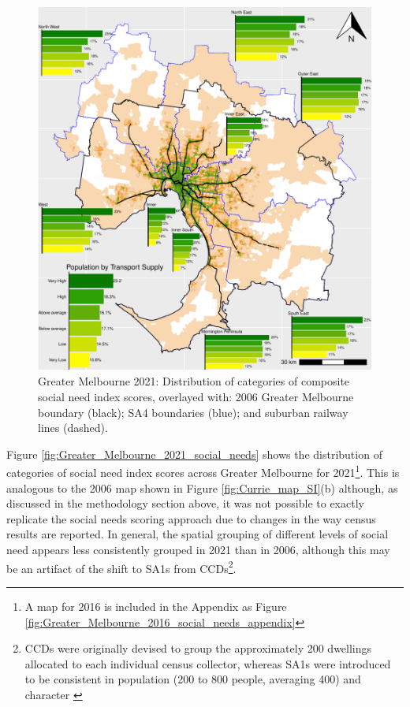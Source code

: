 \documentclass[preprint, 3p,
authoryear]{elsarticle} %
\begin{document}
\begin{figure}
\centering
\includegraphics{ReynoldsCurrieQu2024_files/figure-latex/Greater_Melbourne_2021_social_needs-1.pdf}
\caption{Greater Melbourne 2021: Distribution of categories of composite
social need index scores, overlayed with: 2006 Greater Melbourne
boundary (black); SA4 boundaries (blue); and suburban railway lines
(dashed).}
\end{figure}

Figure \ref{fig:Greater_Melbourne_2021_social_needs} shows the
distribution of categories of social need index scores across Greater
Melbourne for 2021\footnote{A map for 2016 is included in the Appendix
  as Figure \ref{fig:Greater_Melbourne_2016_social_needs_appendix}}.
This is analogous to the 2006 map shown in Figure
\ref{fig:Currie_map_SI}(b) although, as discussed in the methodology
section above, it was not possible to exactly replicate the
\citet{currie2010identifying} social needs scoring approach due to
changes in the way census results are reported. In general, the spatial
grouping of different levels of social need appears less consistently
grouped in 2021 than in 2006, although this may be an artifact of the
shift to SA1s from CCDs\footnote{CCDs were originally devised to group
  the approximately 200 dwellings allocated to each individual census
  collector, whereas SA1s were introduced to be consistent in population
  (200 to 800 people, averaging 400) and character \citep{ABS_SA1s_CCDs}}.
\end{document}
